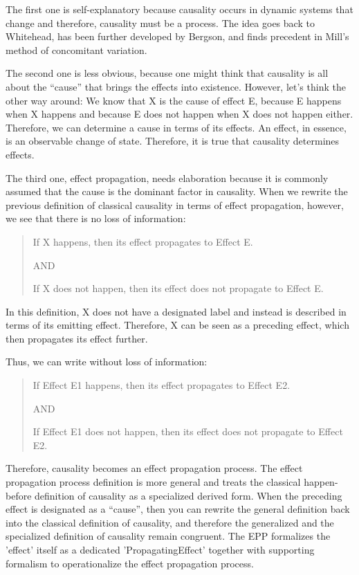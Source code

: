 The first one is self-explanatory because causality occurs in dynamic systems that change and therefore, causality must be a process. The idea goes back to Whitehead, has been further developed by Bergson, and finds precedent in Mill's method of concomitant variation\cite{mill2023system}.  

The second one is less obvious, because one might think that causality is all about the “cause” that brings the effects into existence. However, let’s think the other way around: We know that X is the cause of effect E, because E happens when X happens and because E does not happen when X does not happen either. Therefore, we can determine a cause in terms of its effects. An effect, in essence, is an observable change of state. Therefore, it is true that causality determines effects.

The third one, effect propagation, needs elaboration because it is commonly assumed that the cause is the dominant factor in causality. When we rewrite the previous definition of classical causality in terms of effect propagation, however, we see that there is no loss of information:

\begin{quote}
    If X happens, then its effect propagates to Effect E.

    AND
    
    If X does not happen, then its effect does not propagate to Effect E.
\end{quote}

In this definition, X does not have a designated label and instead is described in terms of its emitting effect. Therefore, X can be seen as a preceding effect, which then propagates its effect further. 

\newpage

Thus, we can write without loss of information:


\begin{quote}
	If Effect E1 happens, then its effect propagates to Effect E2.

    AND
    
	If Effect E1 does not happen, then its effect does not propagate to Effect E2.
\end{quote}

Therefore, causality becomes an effect propagation process. The effect propagation process definition is more general and treats the classical happen-before definition of causality as a specialized derived form. When the preceding effect is designated as a “cause”, then you can rewrite the general definition back into the classical definition of causality, and therefore the generalized and the specialized definition of causality remain congruent. The EPP formalizes the 'effect' itself as a dedicated 'PropagatingEffect' together with supporting formalism to operationalize the effect propagation process.


